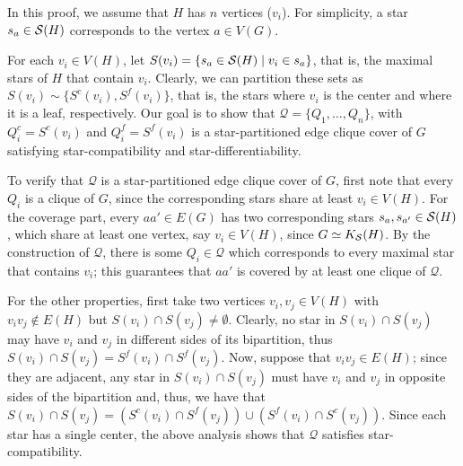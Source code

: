 \begin{tproof}
    In this proof, we assume that $H$ has $n$ vertices ($v_i$). For simplicity, a star $s_a \in \mathcal{S}(H)$ corresponds to the vertex $a \in V(G)$.
    
    For each $v_i \in V(H)$, let $S(v_i) = \{s_a \in \mathcal{S}(H) \mid v_i \in s_a\}$, that is, the maximal stars of $H$ that contain $v_i$.
    Clearly, we can partition these sets as $S(v_i) \sim \{S^c(v_i), S^f(v_i)\}$, that is, the stars where $v_i$ is the center and where it is a leaf, respectively.
    Our goal is to show that $\mathcal{Q} = \{Q_1, \dots, Q_n\}$, with $Q_i^c = S^c(v_i)$ and $Q_i^f = S^f(v_i)$ is a star-partitioned edge clique cover of $G$ satisfying star-compatibility and star-differentiability.
    
    To verify that $\mathcal{Q}$ is a star-partitioned edge clique cover of $G$, first note that every $Q_i$ is a clique of $G$, since the corresponding stars share at least $v_i \in V(H)$.
    For the coverage part, every $aa' \in E(G)$ has two corresponding stars $s_a, s_{a'} \in \mathcal{S}(H)$, which share at least one vertex, say $v_i \in V(H)$, since $G \simeq K_{\mathcal{S}}(H)$.
    By the construction of $\mathcal{Q}$, there is some $Q_i \in \mathcal{Q}$ which corresponds to every maximal star that contains $v_i$; this guarantees that $aa'$ is covered by at least one clique of $\mathcal{Q}$.
    
    For the other properties, first take two vertices $v_i,v_j \in V(H)$ with $v_iv_j \notin E(H)$ but $S(v_i) \cap S(v_j) \neq \emptyset$.
    Clearly, no star in $S(v_i) \cap S(v_j)$ may have $v_i$ and $v_j$ in different sides of its bipartition, thus $S(v_i) \cap S(v_j) = S^f(v_i) \cap S^f(v_j)$.
    Now, suppose that $v_iv_j \in E(H)$; since they are adjacent, any star in $S(v_i) \cap S(v_j)$ must have $v_i$ and $v_j$ in opposite sides of the bipartition and, thus, we have that $S(v_i) \cap S(v_j) = \left(S^c(v_i) \cap S^f(v_j)\right) \cup \left(S^f(v_i) \cap S^c(v_j)\right)$.
    Since each star has a single center, the above analysis shows that $\mathcal{Q}$ satisfies star-compatibility.
    

\end{tproof}
